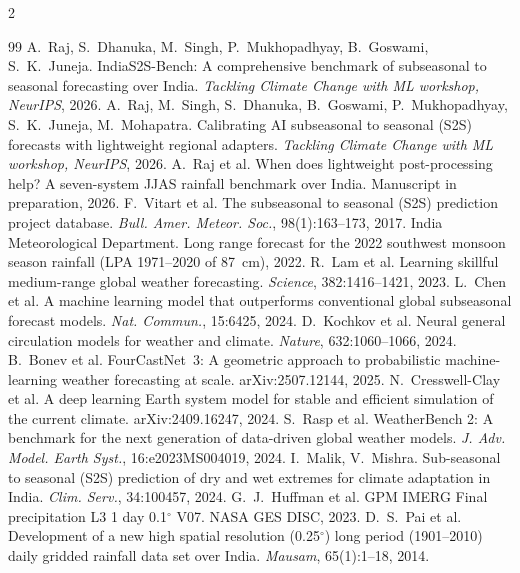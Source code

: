 \documentclass[11pt,a4paper]{article}
\begin{document}
\clearpage
\renewcommand{\refname}{References}
\footnotesize
\setlength{\bibsep}{0.5pt}
\begin{multicols}{2}
\raggedright\sloppy
\begin{thebibliography}{99}
 A.~Raj, S.~Dhanuka, M.~Singh, P.~Mukhopadhyay, B.~Goswami, S.~K.~Juneja. IndiaS2S-Bench: A comprehensive benchmark of subseasonal to seasonal forecasting over India. \emph{Tackling Climate Change with ML workshop, NeurIPS}, 2026.
 A.~Raj, M.~Singh, S.~Dhanuka, B.~Goswami, P.~Mukhopadhyay, S.~K.~Juneja, M.~Mohapatra. Calibrating AI subseasonal to seasonal (S2S) forecasts with lightweight regional adapters. \emph{Tackling Climate Change with ML workshop, NeurIPS}, 2026.
 A.~Raj et al. When does lightweight post-processing help? A seven-system JJAS rainfall benchmark over India. Manuscript in preparation, 2026.
 F.~Vitart et al. The subseasonal to seasonal (S2S) prediction project database. \emph{Bull. Amer. Meteor. Soc.}, 98(1):163--173, 2017.
 India Meteorological Department. Long range forecast for the 2022 southwest monsoon season rainfall (LPA 1971--2020 of 87~cm), 2022.
 R.~Lam et al. Learning skillful medium-range global weather forecasting. \emph{Science}, 382:1416--1421, 2023.
 L.~Chen et al. A machine learning model that outperforms conventional global subseasonal forecast models. \emph{Nat. Commun.}, 15:6425, 2024.
 D.~Kochkov et al. Neural general circulation models for weather and climate. \emph{Nature}, 632:1060--1066, 2024.
 B.~Bonev et al. FourCastNet~3: A geometric approach to probabilistic machine-learning weather forecasting at scale. arXiv:2507.12144, 2025.
 N.~Cresswell-Clay et al. A deep learning Earth system model for stable and efficient simulation of the current climate. arXiv:2409.16247, 2024.
 S.~Rasp et al. WeatherBench 2: A benchmark for the next generation of data-driven global weather models. \emph{J. Adv. Model. Earth Syst.}, 16:e2023MS004019, 2024.
 I.~Malik, V.~Mishra. Sub-seasonal to seasonal (S2S) prediction of dry and wet extremes for climate adaptation in India. \emph{Clim. Serv.}, 34:100457, 2024.
 G.~J.~Huffman et al. GPM IMERG Final precipitation L3 1 day 0.1$^\circ$ V07. NASA GES DISC, 2023.
 D.~S.~Pai et al. Development of a new high spatial resolution (0.25$^\circ$) long period (1901--2010) daily gridded rainfall data set over India. \emph{Mausam}, 65(1):1--18, 2014.

\end{thebibliography}
\end{multicols}
\end{document}
